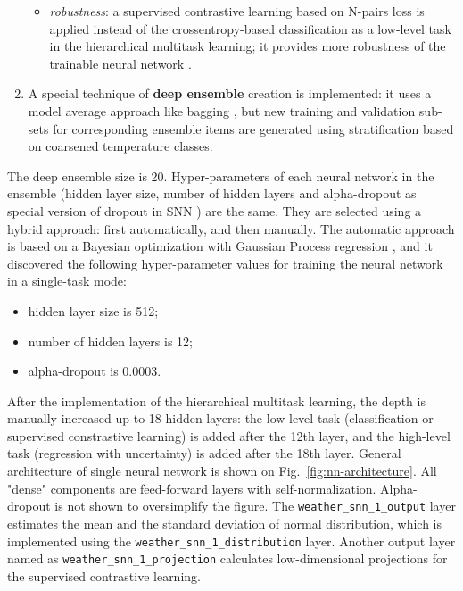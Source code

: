 \documentclass{article}
\begin{document}
\begin{enumerate}
\begin{itemize}
            \item \emph{robustness}: a supervised contrastive learning based on N-pairs loss \cite{Sohn2016ImprovedDM} is applied instead of the crossentropy-based classification as a low-level task in the hierarchical multitask learning; it provides more robustness of the trainable neural network \cite{Khosla2020npairs}.
        \end{itemize}
    \item A special technique of \textbf{deep ensemble} creation is implemented: it uses a model average approach like bagging \cite{Breiman2004BaggingP}, but new training and validation sub-sets for corresponding ensemble items are generated using stratification based on coarsened temperature classes.
\end{enumerate}

The deep ensemble size is 20. Hyper-parameters of each neural network in the ensemble (hidden layer size, number of hidden layers and alpha-dropout as special version of dropout in SNN \cite{Klambauer2017}) are the same. They are selected using a hybrid approach: first automatically, and then manually. The automatic approach is based on a Bayesian optimization with Gaussian Process regression \cite{Frazier2018ATO}, and it discovered the following hyper-parameter values for training the neural network in a single-task mode:

\begin{itemize}
    \item hidden layer size is 512;
    \item number of hidden layers is 12;
    \item alpha-dropout is 0.0003.
\end{itemize}

After the implementation of the hierarchical multitask learning, the depth is manually increased up to 18 hidden layers: the low-level task (classification or supervised constrastive learning) is added after the 12th layer, and the high-level task (regression with uncertainty) is added after the 18th layer. General architecture of single neural network is shown on Fig.~\ref{fig:nn-architecture}. All "dense" components are feed-forward layers with self-normalization. Alpha-dropout is not shown to oversimplify the figure. The \texttt{weather\_snn\_1\_output} layer estimates the mean and the standard deviation of normal distribution, which is implemented using the \texttt{weather\_snn\_1\_distribution} layer. Another output layer named as \texttt{weather\_snn\_1\_projection} calculates low-dimensional projections for the supervised contrastive learning.
\end{document}
